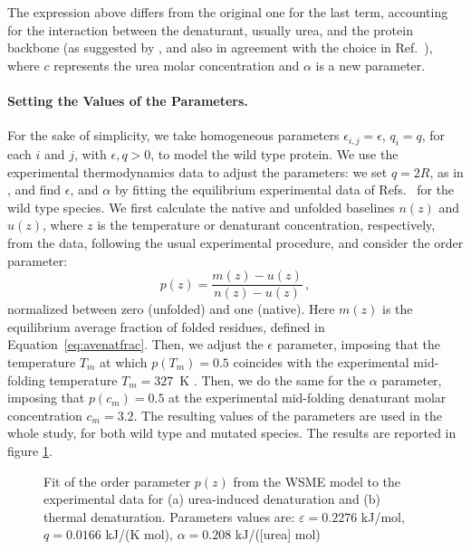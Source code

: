The expression above differs from the original one for the  last term,
accounting for the interaction between the denaturant, usually urea,
and the protein backbone
(as suggested by \citet{Auton2007}, and also in agreement
with the choice in Ref.~\cite{Ferreiro2008}), where $c$ represents the urea
molar concentration and $\alpha$ is a new parameter.

\paragraph{Setting the Values of the Parameters.}
For the sake of simplicity,  we take homogeneous parameters $\epsilon_{i,j} =
\epsilon$, $q_i=q$, for each $i$ and $j$, with $\epsilon,q>0$, to model the wild
type protein.
We use the experimental thermodynamics data to adjust the parameters: we set
$q=2 R$, as in \cite{Zamparo2006a},
and find $ \epsilon$, and $\alpha$ by fitting the equilibrium experimental data
of Refs.~\cite{Mosavi2002a,Lowe2007a} for the wild type species. 
We first
calculate the native and unfolded baselines $n(z)$ and $u(z)$, where $z$ is the
temperature or denaturant concentration, respectively, from the data, following
the usual experimental procedure, and consider the order parameter:
\begin{equation}
 p(z)=\frac{m(z)-u(z)}{n(z)-u(z)}\,,
\label{eq:ordpar_p}
\end{equation}
normalized between zero (unfolded) and one (native). 
Here $m(z)$ is the equilibrium average fraction of folded residues, defined  in
Equation~\ref{eq:avenatfrac}.
Then, we adjust the $\epsilon$ parameter, imposing that the temperature $T_m$ at
which $p(T_m)=0.5$ coincides with the experimental mid-folding temperature
$T_m=327$~K . Then, we do the same for the $\alpha$ parameter, imposing that
$p(c_m)=0.5$ at the experimental mid-folding denaturant molar concentration
$c_m=3.2$. The resulting values of the parameters are used in the whole study,
for both wild type and mutated species.
The results are reported in figure \ref{fig:den-fit}.
\begin{figure}
\centering
\subfigure[{\protect [Urea]}]{
\resizebox{0.4\textwidth}{!}{\sffamily}}
\subfigure[Temperature]{
\resizebox{0.4\textwidth}{!}{\sffamily}}
\caption{
\label{fig:den-fit} 
Fit of the order parameter $p(z)$ from the WSME model to the experimental data
for (a) urea-induced denaturation{\protect \cite{Lowe2007a}} and (b) thermal
denaturation{\protect \cite{Mosavi2002a}}.
Parameters values are: $\varepsilon=0.2276$ kJ/mol, %
$q=0.0166$  kJ/(K mol), $\alpha=0.208$ kJ/([urea] mol)}
\end{figure}

